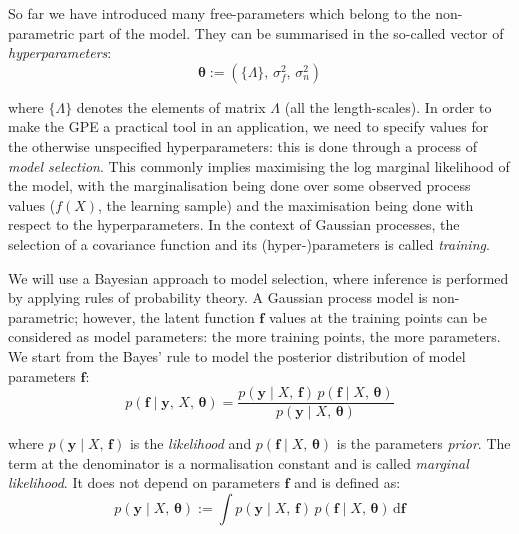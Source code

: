 So far we have introduced many free-parameters which belong to the non-parametric part of the model. They can be summarised in the so-called vector of \textit{hyperparameters}:
\begin{equation}
    \boldsymbol{\theta}:=(\{\Lambda\},\,\sigma_f^2,\,\sigma_n^2)    
\end{equation}

\noindent
where $\{\Lambda\}$ denotes the elements of matrix $\Lambda$ (all the length-scales). In order to make the GPE a practical tool in an application, we need to specify values for the otherwise unspecified hyperparameters: this is done through a process of \textit{model selection}. This commonly implies maximising the log marginal likelihood of the model, with the marginalisation being done over some observed process values ($f(X)$, the learning sample) and the maximisation being done with respect to the hyperparameters. In the context of Gaussian processes, the selection of a covariance function and its (hyper-)parameters is called \textit{training}.

\vspace{0.2cm}
We will use a Bayesian approach to model selection, where inference is performed by applying rules of probability theory. A Gaussian process model is non-parametric; however, the latent function $\mathbf{f}$ values at the training points can be considered as model parameters: the more training points, the more parameters. We start from the Bayes' rule to model the posterior distribution of model parameters $\mathbf{f}$:
%
\begin{equation}
    p(\mathbf{f}\;\vert\; \mathbf{y},\,X,\,\boldsymbol{\theta}) = \frac{p(\mathbf{y}\;\vert\; X,\,\mathbf{f})\,p(\mathbf{f}\;\vert\; X,\,\boldsymbol{\theta})}{p(\mathbf{y}\;\vert\; X,\,\boldsymbol{\theta})}    
\end{equation}

\noindent
where $p(\mathbf{y}\;\vert\; X,\,\mathbf{f})$ is the \textit{likelihood} and $p(\mathbf{f}\;\vert\; X,\,\boldsymbol{\theta})$ is the parameters \textit{prior}. The term at the denominator is a normalisation constant and is called \textit{marginal likelihood}. It does not depend on parameters $\mathbf{f}$ and is defined as:
\begin{equation}
    p(\mathbf{y}\;\vert\; X,\,\boldsymbol{\theta}) := \int p(\mathbf{y}\;\vert\; X,\,\mathbf{f})\,p(\mathbf{f}\;\vert\; X,\,\boldsymbol{\theta})\,\text{d}\mathbf{f}
\end{equation}

